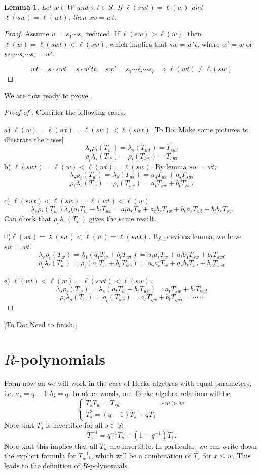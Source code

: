 \documentclass[12pt]{amsart}
\numberwithin{equation}{section}
\theoremstyle{plain}
\newtheorem{lemma}[theorem]{Lemma}
\theoremstyle{definition}
\newcommand{\todo}[1]{{\color{red}[To Do: #1]}}
\begin{document}
\begin{lemma}
	Let $w\in W$ and $s,t\in S$. If $\ell(swt)=\ell(w)$ and $\ell(sw)=\ell(wt)$, then $sw=wt$.
\end{lemma}
\begin{proof}
	Assume $w=s_1\cdots s_r$ reduced. If $\ell(sw)>\ell(w)$, then $\ell(w)=\ell(swt)<\ell(sw)$, which implies that $sw=w't$, where $w'=w$ or $s s_1\cdots \hat s_i\cdots s_r=w'$.
	
	\[wt=s\cdot swt=s\cdot w't t=sw'=s_1\cdots \hat{s_i}\cdots s_r\implies \ell(wt)\neq \ell(sw)\]
\end{proof}
We are now ready to prove .
\begin{proof}[Proof of ]Consider the following cases.
	
	a) $\ell(w)=\ell(wt)=\ell(sw)<\ell(swt)$
	\todo{Make some pictures to illustrate the cases}
	\[\lambda_s\rho_t(T_w)=\lambda_s(T_{wt})=T_{swt}\]
	\[\rho_t\lambda_s(T_w)=\rho_t(T_{sw})=T_{swt}\]
	b) $\ell(swt)=\ell(w)<\ell(wt)=\ell(sw)$. By lemma $sw=wt$.
	\[\lambda_s\rho_t(T_w)=\lambda_s(T_{wt})=a_sT_{wt}+b_sT_{swt}\]
	\[\rho_t\lambda_s(T_w)=\rho_t(T_{sw})=a_tT_{sw}+b_tT_{swt}\]
	
	c) $\ell(swt)<\ell(sw)=\ell(wt)<\ell(w)$
	\[\lambda_s\rho_t(T_w) \lambda_s(a_t T_w+b_t T_{wt}=a_t a_s T_w+a_t b_s T_{sw} +b_t a_s T_{wt} +b_t b_s T_{sw} \]
	Can check that $\rho_t \lambda_s(T_w)$ gives the same result.
	
	d)$\ell(wt)=\ell(sw)<\ell(w)=\ell(swt)$. By previous lemma, we have $sw=wt$.
	\[ \lambda_s\rho_t(T_w)=\lambda_s(a_tT_w+b_t T_{wt})=a_ta_sT_w+a_tb_sT_{sw}+b_t T_{swt} \]
	\[\rho_t\lambda_t(T_w)=\rho_t(a_s T_w+b_s T_{sw})=a_sa_tT_w+a_sb_tT_{wt}+b_sT_{swt}\]
	
	e) $\ell(wt)<\ell(w)=\ell(swt)<\ell(sw)$.
	\[\lambda_s\rho_t(T_w)=\lambda_s(a_t T_w+b_tT_{wt})=a_t T_{sw}+b_tT_{swt}\]
	\[\rho_t \lambda_s(T_w)=\rho_t(T_{sw})=a_t T_{sw}+b_t T_{swt}=\cdots \cdots\] 
\end{proof}
\todo{Need to finish.}
\section{$R$-polynomials}
From now on we will work in the case of Hecke algebras with equal parameters, i.e. $a_s=q-1,b_s=q$. In other words, out Hecke algebra relations will be
\[\begin{cases}
	T_sT_w=T_{sw}&sw>w\\
	T_s^2=(q-1)T_s+qT_1
\end{cases}\]
Note that $T_s$ is invertible for all $s\in S$:
\[T_s^{-1}=q^{-1}T_s-(1-q^{-1})T_1.\]
Note that this implies that all $T_w$ are invertible. In particular, we can write down the explicit formula for $T_{w^{-1}}^{-1}$, which will be a combination of $T_x$ for $x\leq w$. This leads to the definition of $R$-polynomials.
\end{document}
